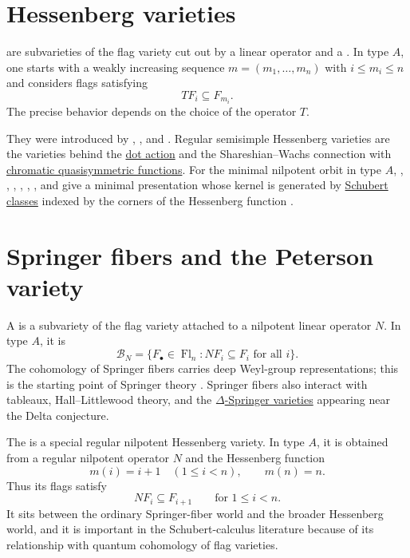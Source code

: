 \section[hessenbergVarietiesBackground]{Hessenberg varieties}

\label{hessenbergVarietyDefinition} are
subvarieties of the flag variety cut out by a linear operator and a
\label{hessenbergFunctionDefinition}.  In type $A$,
one starts with a weakly increasing sequence $m=(m_1,\dotsc,m_n)$ with
$i\leq m_i\leq n$ and considers flags satisfying
\[
  T F_i\subseteq F_{m_i}.
\]
The precise behavior depends on the choice of the operator $T$.

They were introduced by , , and
 \cite{MariProcesiShayman1992}.  Regular semisimple
Hessenberg varieties are the varieties behind the
\hyperref[dotAction]{dot action} and the Shareshian--Wachs connection with
\hyperref[chromaticQuasisymmetricHessenberg]{chromatic quasisymmetric
functions}.
For the minimal nilpotent orbit in type $A$, ,
, , ,
, , and  give a
minimal presentation whose kernel is generated by
\hyperref[schubert]{Schubert classes} indexed by the corners of the
Hessenberg function \cite[Thm.~B]{GaggeroEtAl2026x}.


\section[springerFibers]{Springer fibers and the Peterson variety}

A \label{springerFiberDefinition} is a subvariety of the
flag variety attached to a nilpotent linear operator $N$.  In type $A$, it is
\[
  \mathcal B_N
  =
  \{F_\bullet\in\operatorname{Fl}_n:N F_i\subseteq F_i
  \text{ for all }i\}.
\]
The cohomology of Springer fibers carries deep Weyl-group representations;
this is the starting point of Springer theory \cite{Springer1978}.  Springer
fibers also interact with tableaux, Hall--Littlewood theory, and the
\hyperref[deltaSpringerHallLittlewood]{$\Delta$-Springer varieties} appearing
near the Delta conjecture.

The \label{petersonVarietyDefinition} is a special
regular nilpotent Hessenberg variety.  In type $A$, it is obtained from a
regular nilpotent operator $N$ and the Hessenberg function
\[
  m(i)=i+1\quad(1\leq i<n),\qquad m(n)=n.
\]
Thus its flags satisfy
\[
  N F_i\subseteq F_{i+1}\qquad\text{for }1\leq i<n.
\]
It sits between the ordinary Springer-fiber world and the broader Hessenberg
world, and it is important in the Schubert-calculus literature because of its
relationship with quantum cohomology of flag varieties.


